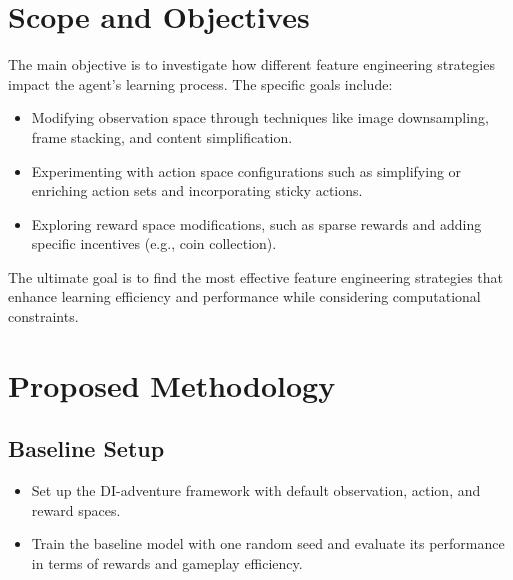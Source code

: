 \documentclass[12pt]{article}
\begin{document}
\section*{Scope and Objectives}
The main objective is to investigate how different feature engineering strategies impact the agent's learning process. The specific goals include:
\begin{itemize}
    \item Modifying observation space through techniques like image downsampling, frame stacking, and content simplification.
    \item Experimenting with action space configurations such as simplifying or enriching action sets and incorporating sticky actions.
    \item Exploring reward space modifications, such as sparse rewards and adding specific incentives (e.g., coin collection).
\end{itemize}
The ultimate goal is to find the most effective feature engineering strategies that enhance learning efficiency and performance while considering computational constraints.

\section*{Proposed Methodology}

\subsection*{Baseline Setup}
\begin{itemize}
    \item Set up the DI-adventure framework with default observation, action, and reward spaces.
    \item Train the baseline model with one random seed and evaluate its performance in terms of rewards and gameplay efficiency.
\end{itemize}
\end{document}
